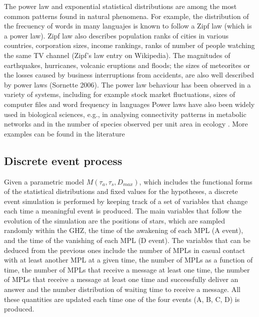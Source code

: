 The power law and exponential statistical distributions are among the
most common patterns found in natural phenomena.
%
For example, the distribution of the frecuency of words in many
languajes is known to follow a Zipf law (which is a power law).
%
Zipf law also describes population ranks of cities in various
countries, corporation sizes, income rankings, ranks of number of
people watching the same TV channel (Zipf's law entry on Wikipedia).
%
The magnitudes of earthquakes, hurricanes, volcanic eruptions and
floods; the sizes of meteorites or the losses caused by business
interruptions from accidents, are also well described by power laws
(Sornette 2006).
%
The power law behaviour has been observed in a variety of systems,
including for example stock market fluctuations, sizes of computer
files and word frequency in languages \citep{mitzenmacher_brief_2004,
newman_power_2005, simkin_theory_2006}
%
Power laws have also been widely used in biological sciences, e.g., in
analysing connectivity patterns in metabolic networks
\citep{jeong_large_2000} and in the number of species observed per
unit area in ecology \citep{martin_origin_2006, frank_common_2009}.
% 
More examples can be found in the literature
\citep{martin_origin_2006, maccone_KLT_2010, barabasi_scale_2009,
maccone_evolution_2014, maccone_lognormals_2014,
benguigui_classificacion_2016}
 

\subsection{Discrete event process}

Given a parametric model $M(\tau_a, \tau_s, D_{max})$, which includes
the functional forms of the statistical distributions and fixed values
for the hypotheses, a discrete event simulation is performed by
keeping track of a set of variables that change each time a meaningful
event is produced.
%
The main variables that follow the evolution of the simulation are the
positions of stars, which are sampled randomly within the GHZ, the
time of the awakening of each MPL (A event), and the time of the
vanishing of each MPL (D event).
%
The variables that can be deduced from the previous ones include the
number of MPLs in casual contact with at least another MPL at a given
time, the number of MPLs as a function of time, the number of MPLs
that receive a message at least one time, the number of MPLs that
receive a message at least one time and successfully deliver an answer
and the number distribution of waiting time to receive a message.
%
All these quantities are updated each time one of the four events (A,
B, C, D) is produced.
          

